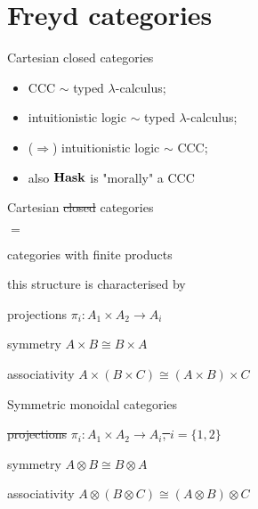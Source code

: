 \section{Freyd categories}

\begin{frame}

    {\huge \center Cartesian closed categories}
    \begin{itemize}
        \item CCC $\sim$ typed $\lambda$-calculus;
        \item intuitionistic logic $\sim$ typed $\lambda$-calculus;
        \item ($\Rightarrow$) intuitionistic logic $\sim$ CCC;
        \item also $\mathbf{Hask}$ is "morally" a CCC
    \end{itemize}
\end{frame}

\begin{frame}
    \begin{center}
    \huge
    Cartesian \sout{closed} categories

    $=$

    categories with finite products
    \end{center}

    this structure is characterised by

    \begin{itemeyez}
        \item[projections] $\pi_i: A_1 \times A_2 \to A_i$
        \item[symmetry] $A \times B \cong B \times A$
        \item[associativity] $A \times (B \times C) \cong (A \times B) \times C$
    \end{itemeyez}
\end{frame}


\begin{frame}
    \begin{center}\huge Symmetric monoidal categories\end{center}
    \begin{itemeyez}
        \item[\sout{projections}] \sout{$\pi_i: A_1 \times A_2 \to A_i$, $i = \{1, 2\}$}
        \item[symmetry] $A \otimes B \cong B \otimes A$
        \item[associativity] $A \otimes (B \otimes C) \cong (A \otimes B) \otimes C$
    \end{itemeyez}

\end{frame}

